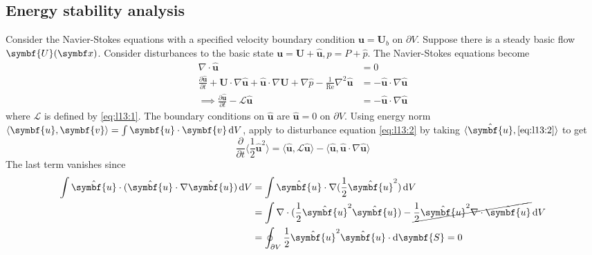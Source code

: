 \documentclass{jknotes}
\renewcommand{\u}{\symbf{u}}
\newcommand{\U}{\symbf{U}}
\newcommand{\ReN}{\text{Re}}
\renewcommand{\L}{\mathcal{L}}
\renewcommand{\v}{\symbf{v}}
\begin{document}
\subsection{Energy stability analysis}
Consider the Navier-Stokes equations with a specified velocity boundary condition
$\u = \U_b$ on $\partial V$. Suppose there is a steady basic flow $\U(\x)$.
Consider disturbances to the basic state $\u = \U + \hat{\u}, p = P +
\hat{p}$. The Navier-Stokes equations become
\begin{align}
	\nabla \cdot \hat{\u} &= 0 \\
	\frac{\partial \hat{\u}}{\partial t} + \U \cdot \nabla \hat{\u} +
	\hat{\u}\cdot\nabla \U + \nabla \hat{p} - \frac{1}{\ReN} \nabla^2 \hat{\u}
						  &= - \hat{\u}\cdot\nabla \hat{\u} \label{eq:l13:1}\\
		\implies \frac{\partial \hat{\u}}{\partial t} - \L
	\hat{\u} &= -\hat{\u}\cdot\nabla \hat{\u} \label{eq:l13:2}
\end{align}
where $\L$ is defined by \eqref{eq:l13:1}. The boundary conditions on
$\hat{\u}$ are $\hat{\u} = 0$ on $\partial V$. Using energy norm $\langle \u,
\v \rangle = \int \u \cdot \v \, \diffd V$, apply to disturbance equation
\eqref{eq:l13:2} by taking $\langle \hat{\u},\eqref{eq:l13:2}\rangle$ to get
\begin{equation}
	\frac{\partial}{\partial t} \langle \frac{1}{2}\hat{\u}^2\rangle  =
	\langle \hat{\u}, \L\hat{\u}\rangle - \langle \hat{\u},
	\hat{\u}\cdot\nabla\hat{\u} \rangle
\end{equation}
The last term vanishes since
\begin{align}
	\int \hat{\u} \cdot (\hat{\u}\cdot\nabla\hat{\u}) \, \diffd V 
	&= \int \hat{\u}\cdot\nabla(\frac{1}{2}\hat{\u}^2) \, \diffd V \\
	&= \int \nabla \cdot (\frac{1}{2}\hat{\u}^2 \hat{\u}) -
\cancel{\frac{1}{2}\hat{\u}^2 \nabla \cdot \hat{\u}} \, \diffd V \\
	&= \oint_{\partial V} \frac{1}{2} \hat{\u}^2 \hat{\u}\cdot\diffd \symbf{S}
	= 0
\end{align}
		
\end{document}
